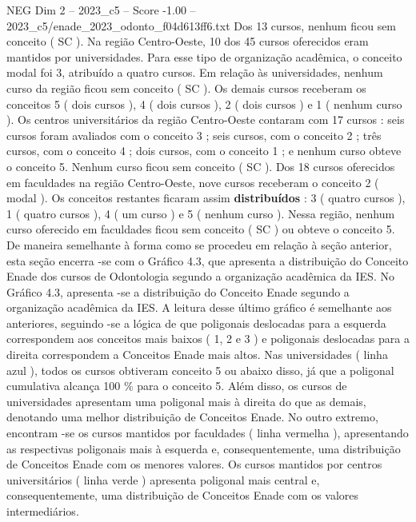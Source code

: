 \begin{textsample}{NEG Dim 2 – 2023\_c5 – Score -1.00 – 2023\_c5/enade\_2023\_odonto\_f04d613ff6.txt}
Dos 13 cursos, nenhum ficou sem conceito ( SC ).
Na região Centro-Oeste, 10 dos 45 cursos oferecidos eram mantidos por universidades.
Para esse tipo de organização acadêmica, o conceito modal foi 3, atribuído a quatro cursos.
Em relação às universidades, nenhum curso da região ficou sem conceito ( SC ).
Os demais cursos receberam os conceitos 5 ( dois cursos ), 4 ( dois cursos ), 2 ( dois cursos ) e 1 ( nenhum curso ).
Os centros universitários da região Centro-Oeste contaram com 17 cursos : seis cursos foram avaliados com o conceito 3 ; seis cursos, com o conceito 2 ; três cursos, com o conceito 4 ; dois cursos, com o conceito 1 ; e nenhum curso obteve o conceito 5.
Nenhum curso ficou sem conceito ( SC ).
Dos 18 cursos oferecidos em faculdades na região Centro-Oeste, nove cursos receberam o conceito 2 ( modal ).
Os conceitos restantes ficaram assim \textbf{distribuídos} : 3 ( quatro cursos ), 1 ( quatro cursos ), 4 ( um curso ) e 5 ( nenhum curso ).
Nessa região, nenhum curso oferecido em faculdades ficou sem conceito ( SC ) ou obteve o conceito 5.
De maneira semelhante à forma como se procedeu em relação à seção anterior, esta seção encerra -se com o Gráfico 4.3, que apresenta a distribuição do Conceito Enade dos cursos de Odontologia segundo a organização acadêmica da IES.
No Gráfico 4.3, apresenta -se a distribuição do Conceito Enade segundo a organização acadêmica da IES.
A leitura desse último gráfico é semelhante aos anteriores, seguindo -se a lógica de que poligonais deslocadas para a esquerda correspondem aos conceitos mais baixos ( 1, 2 e 3 ) e poligonais deslocadas para a direita correspondem a Conceitos Enade mais altos.
Nas universidades ( linha azul ), todos os cursos obtiveram conceito 5 ou abaixo disso, já que a poligonal cumulativa alcança 100 \% para o conceito 5.
Além disso, os cursos de universidades apresentam uma poligonal mais à direita do que as demais, denotando uma melhor distribuição de Conceitos Enade.
No outro extremo, encontram -se os cursos mantidos por faculdades ( linha vermelha ), apresentando as respectivas poligonais mais à esquerda e, consequentemente, uma distribuição de Conceitos Enade com os menores valores.
Os cursos mantidos por centros universitários ( linha verde ) apresenta poligonal mais central e, consequentemente, uma distribuição de Conceitos Enade com os valores intermediários.

\end{textsample}

